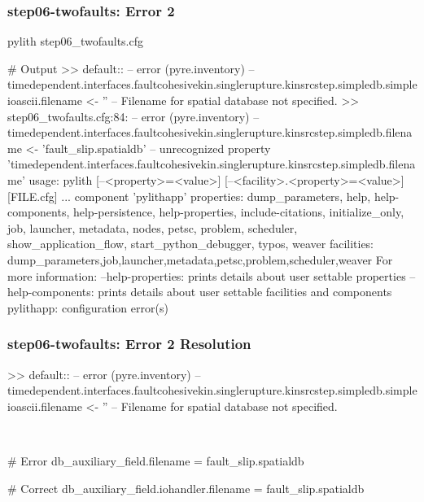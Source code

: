 \documentclass[aspectratio=169]{beamer}
\begin{document}
\begin{frame}[fragile]
  \frametitle{{\ttfamily step06-twofaults}: Error 2}

\begin{pyrejournal}
pylith step06_twofaults.cfg

# Output
 >> {default}::
 -- error (pyre.inventory)
 -- timedependent.interfaces.faultcohesivekin.singlerupture.kinsrcstep.simpledb.simpleioascii.filename <- ''
 -- Filename for spatial database not specified.
 >> step06_twofaults.cfg:84:
 -- error (pyre.inventory)
 -- timedependent.interfaces.faultcohesivekin.singlerupture.kinsrcstep.simpledb.filename <- 'fault_slip.spatialdb'
 -- unrecognized property 'timedependent.interfaces.faultcohesivekin.singlerupture.kinsrcstep.simpledb.filename'
usage: pylith [--<property>=<value>] [--<facility>.<property>=<value>] [FILE.cfg] ...
component 'pylithapp'
    properties: dump_parameters, help, help-components, help-persistence, help-properties, include-citations, initialize_only, job, launcher, metadata, nodes, petsc, problem, scheduler, show_application_flow, start_python_debugger, typos, weaver
    facilities: dump_parameters,job,launcher,metadata,petsc,problem,scheduler,weaver
For more information:
  --help-properties: prints details about user settable properties
  --help-components: prints details about user settable facilities and components
pylithapp: configuration error(s)
\end{pyrejournal}

\end{frame}


\begin{frame}[t,fragile]
  \frametitle{{\ttfamily step06-twofaults}: Error 2 Resolution}

  \tserror
  \begin{pyrejournal}
 >> {default}::
 -- error (pyre.inventory)
 -- timedependent.interfaces.faultcohesivekin.singlerupture.kinsrcstep.simpledb.simpleioascii.filename <- ''
 -- Filename for spatial database not specified.
  \end{pyrejournal}

  \pause\\[1pt]

  \begin{cfgcode}
    # Error
    db_auxiliary_field.filename = fault_slip.spatialdb

    # Correct
    db_auxiliary_field.iohandler.filename = fault_slip.spatialdb
  \end{cfgcode}

\end{frame}
\end{document}
